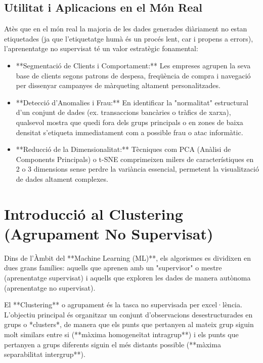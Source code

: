 \documentclass[11pt, a4paper]{article}
\begin{document}
\subsection{Utilitat i Aplicacions en el Món Real}
Atès que en el món real la majoria de les dades generades diàriament no estan etiquetades (ja que l'etiquetatge humà és un procés lent, car i propens a errors), l'aprenentatge no supervisat té un valor estratègic fonamental:
\begin{itemize}
    \item **Segmentació de Clients i Comportament:** Les empreses agrupen la seva base de clients segons patrons de despesa, freqüència de compra i navegació per dissenyar campanyes de màrqueting altament personalitzades.
    \item **Detecció d'Anomalies i Frau:** En identificar la "normalitat" estructural d'un conjunt de dades (ex. transaccions bancàries o tràfics de xarxa), qualsevol mostra que quedi fora dels grups principals o en zones de baixa densitat s'etiqueta immediatament com a possible frau o atac informàtic.
    \item **Reducció de la Dimensionalitat:** Tècniques com PCA (Anàlisi de Components Principals) o t-SNE comprimeixen milers de característiques en 2 o 3 dimensions sense perdre la variància essencial, permetent la visualització de dades altament complexes.
\end{itemize}


\section{Introducció al Clustering (Agrupament No Supervisat)}

Dins de l'Àmbit del **Machine Learning (ML)**, els algorismes es dividixen en dues grans famílies: aquells que aprenen amb un "supervisor" o mestre (aprenentatge supervisat) i aquells que exploren les dades de manera autònoma (aprenentatge no supervisat).

El **Clustering** o agrupament és la tasca no supervisada per excel·lència. L'objectiu principal és organitzar un conjunt d'observacions desestructurades en grups o *clusters*, de manera que els punts que pertanyen al mateix grup siguin molt similars entre si (**màxima homogeneïtat intragrup**) i els punts que pertanyen a grups diferents siguin el més distants possible (**màxima separabilitat intergrup**).
\end{document}
